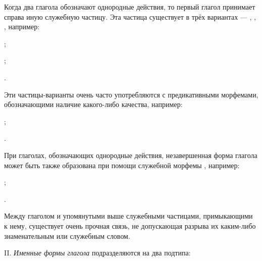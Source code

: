 Когда два глагола обозначают однородные действия, то первый глагол принимает справа иную служебную частицу. Эта частица существует в трёх вариантах --- , , , например:
\begin{prfsample}
	\item {};
	\item {};
	\item {}.
\end{prfsample}
Эти частицы-варианты очень часто употребляются с предикативными морфемами, обозначающими наличие какого-либо качества, например:
\begin{prfsample}
	\item {};
	\item {}.
\end{prfsample}

При глаголах, обозначающих однородные действия, незавершенная форма глагола может быть также образована при помощи служебной морфемы , например:
\begin{prfsample}
	\item {};
	\item {}.	
\end{prfsample}

Между глаголом и упомянутыми выше служебными частицами, примыкающими к нему, существует очень прочная связь, не допускающая разрыва их каким-либо знаменательным или служебным словом.

II. \emph{Именные формы глагола} подразделяются на два подтипа:

